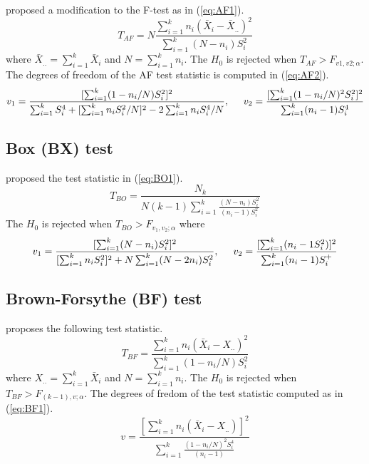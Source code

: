 \cite{asiribo:1990} proposed a modification to the F-test as in (\ref{eq:AF1}).
\begin{equation}
T_{AF}=N\frac{\sum_{i=1}^k n_i(\bar{X}_i-\bar{X}_{..})^2}{\sum_{i=1}^k (N-n_i)S_i^2} \label{eq:AF1}
\end{equation}
where $\bar{X}_{..}=\sum_{i=1}^k \bar{X}_i$ and $N=\sum_{i=1}^k n_i$. The $H_0$ is rejected when $T_{AF}>F_{v1, v2; \alpha}$. The degrees of freedom of the AF test statistic is computed in (\ref{eq:AF2}).
\begin{equation}
v_1=\frac{[\sum_{i=1}^k (1-n_i/N)S_i^2]^2}{\sum_{i=1}^k S_i^4+[\sum_{i=1}^k n_i S_i^2/N]^2-2\sum_{i=1}^k n_i S_i^4/N}, \hspace{5mm}
v_2=\frac{[\sum_{i=1}^k (1-n_i/N)^2 S_i^2]^2}{\sum_{i=1}^k (n_i-1)S_i^4} \label{eq:AF2}
\end{equation}
\subsection{Box (BX) test}

\cite{box:1954} proposed the test statistic in (\ref{eq:BO1}).
\begin{equation}
T_{BO}=\frac{N_k}{N(k-1)\sum_{i=1}^k \frac{(N-n_i)S_i^2}{(n_i-1)S_i^2}} \label{eq:BO1}
\end{equation}
The $H_0$ is rejected when $T_{BO}>F_{v_1, v_2; \alpha}$ where
\begin{equation}
v_1=\frac{[\sum_{i=1}^k (N-n_i)S_i^2]^2}{[\sum_{i=1}^k n_i S_i^2]^2+N\sum_{i=1}^k (N-2n_i)S_i^2}, \hspace{5mm} 
v_2=\frac{[\sum_{i=1}^k (n_i-1 S_i^2)]^2}{\sum_{i=1}^k (n_i-1)S_i^+}
\end{equation}
\subsection{Brown-Forsythe (BF) test}

\cite{brown:1974} proposes the following test statistic.
\begin{equation}
T_{BF}=\frac{\sum_{i=1}^k n_i(\bar{X}_i-X_{..})^2}{\sum_{i=1}^k (1-n_i/N)S_i^2}
\end{equation}
where $X_{..}=\sum_{i=1}^k \bar{X}_i$ and $N=\sum_{i=1}^k n_i$. The $H_0$ is rejected when $T_{BF}>F_{(k-1), v; \alpha}$. The degrees of fredom of the test statistic computed as in (\ref{eq:BF1}).
\begin{equation}
v=\frac{[\sum_{i=1}^k n_i(\bar{X}_i-X_{..})]^2}{\sum_{i=1}^k \frac{(1-n_i/N)^2 S_i^4}{(n_i-1)}} \label{eq:BF1}
\end{equation}
